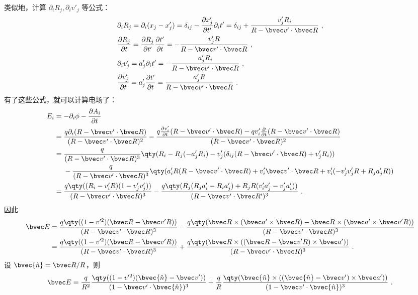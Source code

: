 类似地，计算 $\partial_i R_j,\partial_i v'_j$ 等公式：
\begin{equation}
\begin{aligned}
&\partial_i R_j=\partial_i(x_j-x_j')=\delta_{ij}-\frac{\partial x_j'}{\partial t'}\partial_i t'=\delta_{ij}+\frac{v'_jR_i}{R-\bvec v'\cdot \bvec R}~,
\\
&\frac{\partial R_j}{\partial t}=\frac{\partial R_j}{\partial t'}\frac{\partial t'}{\partial t}=-\frac{v'_jR}{R-\bvec r'\cdot \bvec R}~,
\\
&\partial_i v'_j=a'_j\partial_i t'=-\frac{a'_jR_i}{R-\bvec v'\cdot \bvec R}~,\\
&\frac{\partial v'_j}{\partial t}=a_j'\frac{\partial t'}{\partial t}=\frac{a_j'R}{R-\bvec v'\cdot \bvec R}~.
\end{aligned}
\end{equation}
有了这些公式，就可以计算电场了：
\begin{equation}
\begin{aligned}
E_i&=-\partial_i \phi - \frac{\partial A_i}{\partial t}
\\
&=\frac{q \partial_i (R-\bvec v'\cdot \bvec R)}{(R-\bvec v'\cdot \bvec R)^2}-\frac{q\frac{\partial v'_i}{\partial t}(R-\bvec v'\cdot \bvec R)-qv'_i\frac{\partial}{\partial t}(R-\bvec v'\cdot \bvec R)}{(R-\bvec v'\cdot \bvec R)^2}
\\
&=\frac{q}{(R-\bvec v'\cdot \bvec R)^3}\qty(R_i-R_j(-a_j'R_i)-v'_j(\delta_{ij}(R-\bvec v'\cdot \bvec R)+v'_jR_i))
\\
&\ \ \ \ -\frac{q}{(R-\bvec v'\cdot \bvec R)^3}\qty(a'_iR(R-\bvec v'\cdot \bvec R)+v'_i\bvec v'\cdot \bvec R+v'_i(-v'_jv'_jR+R_ja'_jR))
\\
&=\frac{q\qty((R_i-v_i'R)(1-v'_jv'_j))}{(R-\bvec v'\cdot \bvec R)^3}-\frac{q\qty(R_j(R_ja'_i-R_ia'_j)+R_jR(v'_ia'_j-v'_ja'_i))}{(R-\bvec v'\cdot \bvec R')^3}~.\\
\end{aligned}
\end{equation}
因此
\begin{equation}\label{eq_chgrad_1}
\begin{aligned}
\bvec E&=\frac{q\qty((1-v'^2)(\bvec R-\bvec v'R))}{(R-\bvec v'\cdot \bvec R)^3}-\frac{q\qty(\bvec R\times (\bvec a'\times \bvec R)- \bvec R\times (\bvec a'\times \bvec v'R))}{(R-\bvec v'\cdot \bvec R)^3}\\
&=\frac{q\qty((1-v'^2)(\bvec R-\bvec v'R))}{(R-\bvec v'\cdot \bvec R)^3}+\frac{q\qty(\bvec R\times ((\bvec R-\bvec v'R)\times \bvec a'))}{(R-\bvec v'\cdot \bvec R)^3}~.
\end{aligned}
\end{equation}
设 $\bvec{\hat n}=\bvec R/R$，则
\begin{equation}\label{eq_chgrad_2}
\bvec E=\frac{q}{R^2}\frac{\qty((1-v'^2)(\bvec {\hat n}-\bvec v'))}{(1-\bvec v'\cdot \bvec{\hat n})^3}+\frac{q}{R}\frac{\qty(\bvec{\hat n}\times ((\bvec{\hat n}-\bvec v')\times \bvec a'))}{(1-\bvec v'\cdot \bvec{\hat n})^3}~.
\end{equation}

